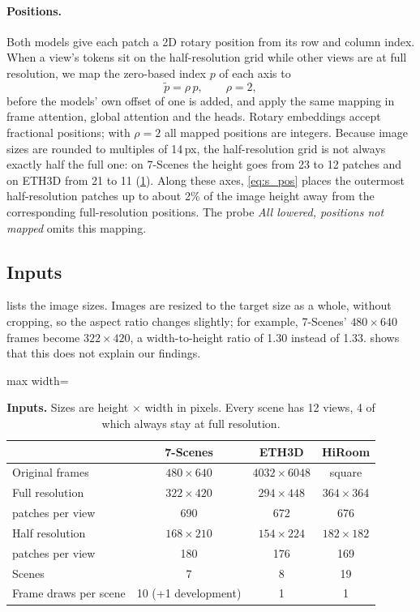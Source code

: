 \documentclass[10pt,twocolumn,letterpaper]{article}
\begin{document}
\paragraph{Positions.}
Both models give each patch a 2D rotary position from its row and column index. When a view's tokens sit on the half-resolution grid while other views are at full resolution, we map the zero-based index $p$ of each axis to
\begin{equation}
  \tilde p = \rho\,p,\qquad \rho=2,
  \label{eq:s_pos}
\end{equation}
before the models' own offset of one is added, and apply the same mapping in frame attention, global attention and the heads. Rotary embeddings accept fractional positions; with $\rho=2$ all mapped positions are integers. Because image sizes are rounded to multiples of 14\,px, the half-resolution grid is not always exactly half the full one: on 7-Scenes the height goes from 23 to 12 patches and on ETH3D from 21 to 11 (\cref{tab:s_sizes}). Along these axes, \cref{eq:s_pos} places the outermost half-resolution patches up to about 2\% of the image height away from the corresponding full-resolution positions. The probe \emph{All lowered, positions not mapped} omits this mapping.

\subsection{Inputs}
 lists the image sizes. Images are resized to the target size as a whole, without cropping, so the aspect ratio changes slightly; for example, 7-Scenes' $480{\times}640$ frames become $322{\times}420$, a width-to-height ratio of 1.30 instead of 1.33.  shows that this does not explain our findings.

\begin{table}[t]
\centering\small
\setlength{\tabcolsep}{3pt}
\begin{adjustbox}{max width=\linewidth}
\begin{tabular}{@{}lccc@{}}
\toprule
 & 7-Scenes & ETH3D & HiRoom \\
\midrule
Original frames         & $480{\times}640$ & $4032{\times}6048$ & square \\
Full resolution         & $322{\times}420$ & $294{\times}448$ & $364{\times}364$ \\
\quad patches per view  & 690 & 672 & 676 \\
Half resolution         & $168{\times}210$ & $154{\times}224$ & $182{\times}182$ \\
\quad patches per view  & 180 & 176 & 169 \\
Scenes                  & 7 & 8 & 19 \\
Frame draws per scene   & 10 (+1 development) & 1 & 1 \\
\bottomrule
\end{tabular}
\end{adjustbox}
\caption{\textbf{Inputs.} Sizes are height $\times$ width in pixels. Every scene has 12 views, 4 of which always stay at full resolution.}
\label{tab:s_sizes}
\end{table}
\end{document}
